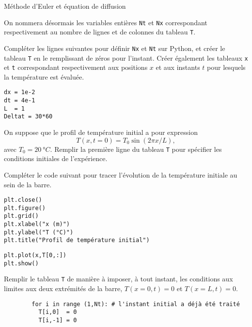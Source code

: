 \begin{exo}[1][python]{Méthode d'Euler et équation de diffusion}
\begin{questions}
      On nommera désormais les variables entières \texttt{Nt} et \texttt{Nx} correspondant respectivement au nombre de lignes  et de colonnes du tableau \texttt{T}.
      
      Compléter les lignes suivantes pour définir \texttt{Nx} et \texttt{Nt} sur Python, et créer le tableau \texttt{T} en le remplissant de zéros pour l'instant. Créer également les tableaux \texttt{x} et \texttt{t} correspondant respectivement aux positions $x$ et aux instants $t$ pour lesquels la température est évaluée.
\begin{verbatim}
dx = 1e-2
dt = 4e-1
L  = 1
Deltat = 30*60
\end{verbatim}
    \item On suppose que le profil de température initial a pour expression 
    $$
    T(x,t=0) = T_0 \sin (2\pi x/L),
    $$
    avec $T_0 = \SI{20}{\degree C}$. Remplir la première ligne du tableau \texttt{T} pour spécifier les conditions initiales de l'expérience.
\solution{
    }
    \item Compléter le code suivant pour tracer l'évolution de la température initiale au sein de la barre.
\begin{verbatim}
plt.close()
plt.figure()
plt.grid()
plt.xlabel("x (m)")
plt.ylabel("T (°C)")
plt.title("Profil de température initial")
\end{verbatim}
\begin{verbatim}
plt.plot(x,T[0,:])
plt.show()
\end{verbatim}
    \end{questions}
    
    
    \begin{questions}
      \item	
      Remplir le tableau \texttt{T} de manière à imposer, à tout instant, les conditions aux limites aux deux extrémités de la barre, $T(x=0,t)=0$ et $T(x=L,t)=0$.
        \begin{verbatim}
        for i in range (1,Nt): # l'instant initial a déjà été traité
          T[i,0]  = 0
          T[i,-1] = 0
        \end{verbatim}
      \end{questions}
      

\end{exo}
